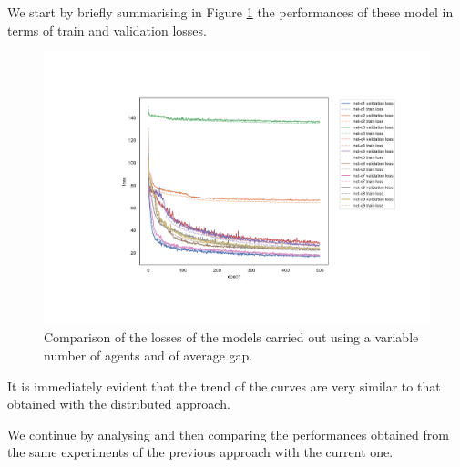 We start by briefly summarising in Figure \ref{fig:commlossallt} the performances 
of these model in terms of train and validation losses.
\begin{figure}[!htb]
	\centering
	\includegraphics[width=.8\textwidth]{contents/images/task1-comm/loss-communication-all@}%
	\caption[Comparison of losses of the second set of experiments.]{Comparison 
	of the losses of the models carried out using a variable number of agents and of 
	average gap.}
	\label{fig:commlossallt}
\end{figure}
It is immediately evident that the trend of the curves are very similar to that 
obtained with the distributed approach. 

We continue by analysing and then comparing the performances obtained from 
the same experiments of the previous approach with the current one.

